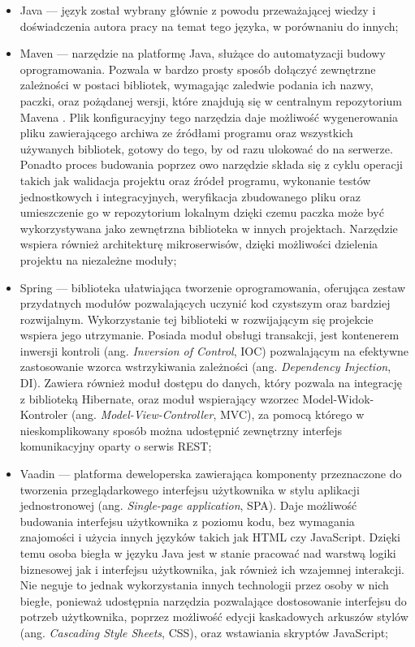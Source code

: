 \documentclass[a4paper]{book}
\newcommand{\obcy}[2]{{\selectlanguage{#1}#2}}
\newcommand{\ang}[1]{\emph{\obcy{british}{#1}}}
\begin{document}
\begin{itemize}
	\item Java --- język został wybrany głównie z powodu przeważającej wiedzy i doświadczenia autora pracy na temat tego języka, w porównaniu do innych;
	\item Maven \cite{id:Maven} --- narzędzie na platformę Java, służące do automatyzacji budowy oprogramowania. Pozwala w bardzo prosty sposób dołączyć zewnętrzne zależności w postaci bibliotek, wymagając zaledwie podania ich nazwy, paczki, oraz pożądanej wersji, które znajdują się w centralnym repozytorium Mavena \cite{id:MVNrepository}. Plik konfiguracyjny tego narzędzia daje możliwość wygenerowania  pliku zawierającego archiwa ze źródłami programu oraz wszystkich używanych bibliotek, gotowy do tego, by od razu ulokować do na serwerze. Ponadto proces budowania poprzez owo narzędzie składa się z cyklu operacji takich jak walidacja projektu oraz źródeł programu, wykonanie testów jednostkowych i integracyjnych, weryfikacja zbudowanego pliku oraz umieszczenie go w repozytorium lokalnym dzięki czemu paczka może być wykorzystywana jako zewnętrzna biblioteka w innych projektach. Narzędzie wspiera również architekturę mikroserwisów, dzięki możliwości dzielenia projektu na niezależne moduły;
	\item Spring \cite{id:Spring} --- biblioteka ułatwiająca tworzenie oprogramowania, oferująca zestaw przydatnych modułów pozwalających uczynić kod czystszym oraz bardziej rozwijalnym. Wykorzystanie tej biblioteki w rozwijającym się projekcie wspiera jego utrzymanie. Posiada moduł obsługi transakcji, jest kontenerem inwersji kontroli (ang. \ang{Inversion of Control}, IOC) pozwalającym na efektywne zastosowanie wzorca wstrzykiwania zależności (ang. \ang{Dependency Injection}, DI). Zawiera również moduł dostępu do danych, który pozwala na integrację z biblioteką Hibernate, oraz moduł wspierający wzorzec Model-Widok-Kontroler (ang. \ang{Model-View-Controller}, MVC), za pomocą którego w nieskomplikowany sposób można udostępnić zewnętrzny interfejs komunikacyjny oparty o serwis REST;
	\item Vaadin \cite{id:Vaadin} --- platforma deweloperska zawierająca komponenty przeznaczone do tworzenia przeglądarkowego interfejsu użytkownika w stylu aplikacji jednostronowej (ang. \ang{Single-page application}, SPA). Daje możliwość budowania interfejsu użytkownika z poziomu kodu, bez wymagania znajomości i użycia innych języków takich jak HTML czy JavaScript. Dzięki temu osoba biegła w języku Java jest w stanie pracować nad warstwą logiki biznesowej jak i interfejsu użytkownika, jak również ich wzajemnej interakcji. Nie neguje to jednak wykorzystania innych technologii przez osoby w nich biegłe, ponieważ udostępnia narzędzia pozwalające dostosowanie interfejsu do potrzeb użytkownika, poprzez możliwość edycji kaskadowych arkuszów stylów (ang. \ang{Cascading Style Sheets}, CSS), oraz wstawiania skryptów JavaScript;

\end{itemize}
\end{document}
